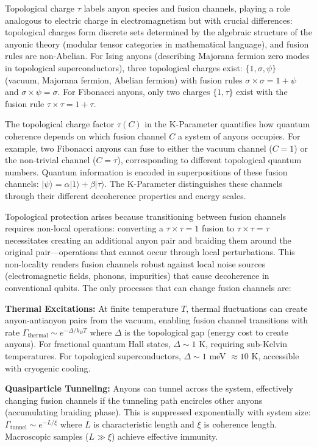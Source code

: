\documentclass[11pt,a4paper,twoside]{article}
\begin{document}
Topological charge $\tau$ labels anyon species and fusion channels, playing a role analogous to electric charge in electromagnetism but with crucial differences: topological charges form discrete sets determined by the algebraic structure of the anyonic theory (modular tensor categories in mathematical language), and fusion rules are non-Abelian. For Ising anyons (describing Majorana fermion zero modes in topological superconductors), three topological charges exist: $\{1, \sigma, \psi\}$ (vacuum, Majorana fermion, Abelian fermion) with fusion rules $\sigma \times \sigma = 1 + \psi$ and $\sigma \times \psi = \sigma$. For Fibonacci anyons, only two charges $\{1, \tau\}$ exist with the fusion rule $\tau \times \tau = 1 + \tau$.

The topological charge factor $\tau(C)$ in the K-Parameter quantifies how quantum coherence depends on which fusion channel $C$ a system of anyons occupies. For example, two Fibonacci anyons can fuse to either the vacuum channel ($C = 1$) or the non-trivial channel ($C = \tau$), corresponding to different topological quantum numbers. Quantum information is encoded in superpositions of these fusion channels: $|\psi\rangle = \alpha|1\rangle + \beta|\tau\rangle$. The K-Parameter distinguishes these channels through their different decoherence properties and energy scales.

Topological protection arises because transitioning between fusion channels requires non-local operations: converting a $\tau \times \tau = 1$ fusion to $\tau \times \tau = \tau$ necessitates creating an additional anyon pair and braiding them around the original pair---operations that cannot occur through local perturbations. This non-locality renders fusion channels robust against local noise sources (electromagnetic fields, phonons, impurities) that cause decoherence in conventional qubits. The only processes that can change fusion channels are:

\textbf{Thermal Excitations:} At finite temperature $T$, thermal fluctuations can create anyon-antianyon pairs from the vacuum, enabling fusion channel transitions with rate $\Gamma_{\text{thermal}} \sim e^{-\Delta/k_BT}$ where $\Delta$ is the topological gap (energy cost to create anyons). For fractional quantum Hall states, $\Delta \sim 1$ K, requiring sub-Kelvin temperatures. For topological superconductors, $\Delta \sim 1$ meV $\approx 10$ K, accessible with cryogenic cooling.

\textbf{Quasiparticle Tunneling:} Anyons can tunnel across the system, effectively changing fusion channels if the tunneling path encircles other anyons (accumulating braiding phase). This is suppressed exponentially with system size: $\Gamma_{\text{tunnel}} \sim e^{-L/\xi}$ where $L$ is characteristic length and $\xi$ is coherence length. Macroscopic samples ($L \gg \xi$) achieve effective immunity.
\end{document}
